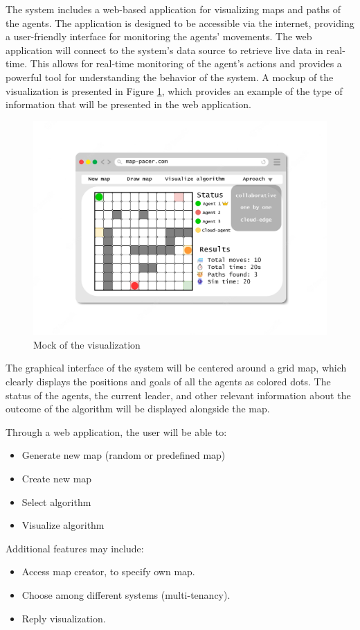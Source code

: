 The system includes a web-based application for visualizing maps and paths of the agents. The application is designed to be accessible via the internet, providing a user-friendly interface for monitoring the agents' movements. The web application will connect to the system's data source to retrieve live data in real-time. This allows for real-time monitoring of the agent's actions and provides a powerful tool for understanding the behavior of the system. A mockup of the visualization is presented in Figure \ref{fig:vis_mock}, which provides an example of the type of information that will be presented in the web application. 

\begin{figure}[H]
    \centering
    \includegraphics[width=\textwidth]{pictures/frontenf_mock.png}
    \caption{ Mock of the visualization }
    \label{fig:vis_mock}
\end{figure}

The graphical interface of the system will be centered around a grid map, which clearly displays the positions and goals of all the agents as colored dots. The status of the agents, the current leader, and other relevant information about the outcome of the algorithm will be displayed alongside the map.

Through a web application, the user will be able to:
\begin{itemize}
\itemsep0em 
    \item Generate new map (random or predefined map)
    \item Create new map
    \item Select algorithm
    \item Visualize algorithm
\end{itemize}
Additional features may include:
\begin{itemize}
\itemsep0em 
    \item Access map creator, to specify own map.
    \item Choose among different systems (multi-tenancy).
    \item Reply visualization.
\end{itemize}